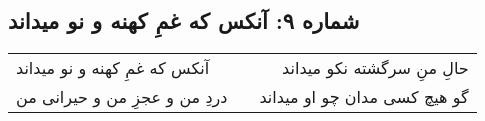 \begin{center}
\section*{شماره ۹: آنکس که غمِ کهنه و نو میداند}
\label{sec:009}
\begin{longtable}{l p{0.5cm} r}
آنکس که غمِ کهنه و نو میداند
&&
حالِ منِ سرگشته نکو میداند
\\
دردِ من و عجزِ من و حیرانی من
&&
گو هیچ کسی مدان چو او میداند
\\
\end{longtable}
\end{center}
